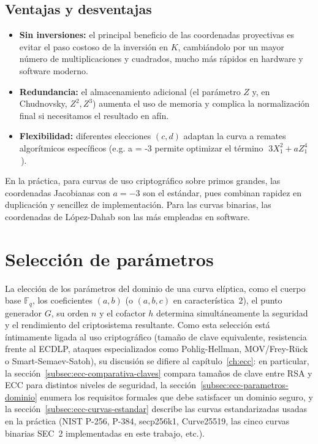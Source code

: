 \subsection{Ventajas y desventajas}
\begin{itemize}
  \item \textbf{Sin inversiones:} el principal beneficio de las coordenadas proyectivas es evitar el paso costoso de la inversión en \(K\), cambiándolo por un mayor número de multiplicaciones y cuadrados, mucho más rápidos en hardware y software moderno.
  \item \textbf{Redundancia:} el almacenamiento adicional (el parámetro \(Z\) y, en Chudnovsky, \(Z^2,Z^3\)) aumenta el uso de memoria y complica la normalización final si necesitamos el resultado en afín.
  \item \textbf{Flexibilidad:} diferentes elecciones \((c,d)\) adaptan la curva a remates algorítmicos específicos (e.g. a = -3 permite optimizar el término \(\;3X_1^2 + aZ_1^4\)\,).
\end{itemize}

En la práctica, para curvas de uso criptográfico sobre primos grandes, las coordenadas Jacobianas con \(a=-3\) son el estándar, pues combinan rapidez en duplicación y sencillez de implementación.
Para las curvas binarias, las coordenadas de López-Dahab son las más empleadas en software.


\section{Selección de parámetros}\label{sec:seleccion_parametros_ch4}

La elección de los parámetros del dominio de una curva elíptica, como el cuerpo base \(\mathbb{F}_q\), los coeficientes \((a,b)\) (o \((a,b,c)\) en característica~2), el punto generador \(G\), su orden \(n\) y el cofactor \(h\) determina simultáneamente la seguridad y el rendimiento del criptosistema resultante. Como esta selección está íntimamente ligada al uso criptográfico (tamaño de clave equivalente, resistencia frente al ECDLP, ataques especializados como Pohlig-Hellman, MOV/Frey-Rück o Smart-Semaev-Satoh), su discusión se difiere al capítulo~\ref{ch:ecc}: en particular, la sección~\ref{subsec:ecc-comparativa-claves} compara tamaños de clave entre RSA y ECC para distintos niveles de seguridad, la sección~\ref{subsec:ecc-parametros-dominio} enumera los requisitos formales que debe satisfacer un dominio seguro, y la sección~\ref{subsec:ecc-curvas-estandar} describe las curvas estandarizadas usadas en la práctica (NIST P-256, P-384, secp256k1, Curve25519, las cinco curvas binarias SEC~2 implementadas en este trabajo, etc.).
